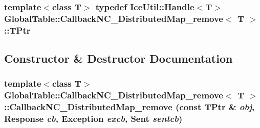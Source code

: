 \label{class_global_table_1_1_callback_n_c___distributed_map__remove_afd84ad88b313577ef250caab113b43a3}
\hypertarget{class_global_table_1_1_callback_n_c___distributed_map__remove_a5ae7d6daca40ba4c93198ac3fef691ae}{
\subsubsection[{TPtr}]{\setlength{\rightskip}{0pt plus 5cm}template$<$class T$>$ typedef IceUtil::Handle$<$T$>$ {\bf GlobalTable::CallbackNC\_\-DistributedMap\_\-remove}$<$ T $>$::{\bf TPtr}}}
\label{class_global_table_1_1_callback_n_c___distributed_map__remove_a5ae7d6daca40ba4c93198ac3fef691ae}


\subsection{Constructor \& Destructor Documentation}
\hypertarget{class_global_table_1_1_callback_n_c___distributed_map__remove_ada90e97586828f232a5a551cd68fb438}{
\subsubsection[{CallbackNC\_\-DistributedMap\_\-remove}]{\setlength{\rightskip}{0pt plus 5cm}template$<$class T$>$ {\bf GlobalTable::CallbackNC\_\-DistributedMap\_\-remove}$<$ T $>$::{\bf CallbackNC\_\-DistributedMap\_\-remove} (const {\bf TPtr} \& {\em obj}, \/  {\bf Response} {\em cb}, \/  {\bf Exception} {\em excb}, \/  {\bf Sent} {\em sentcb})}}
\label{class_global_table_1_1_callback_n_c___distributed_map__remove_ada90e97586828f232a5a551cd68fb438}


